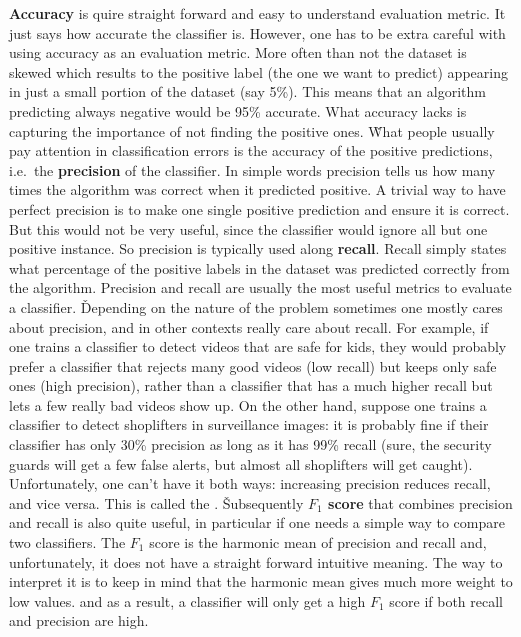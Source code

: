 \textbf{Accuracy} is quire straight forward and easy to understand evaluation metric. It just says how accurate the
classifier is. However, one has to be extra careful with using accuracy as an evaluation metric. More often than not
the dataset is skewed which results to the positive label (the one we want to predict) appearing in just a small
portion of the dataset (say 5\%). This means that an algorithm predicting always negative would be 95\% accurate.
What accuracy lacks is capturing the importance of not finding the positive ones. \v

What people usually pay attention in classification errors is the accuracy of the positive predictions, i.e.\ the
\textbf{precision} of the classifier. In simple words precision tells us how many times the algorithm was correct
when it predicted positive. A trivial way to have perfect precision is to make one single positive prediction and
ensure it is correct. But this would not be very useful, since the classifier would ignore all but one positive
instance. So precision is typically used along \textbf{recall}. Recall simply states what percentage of the positive
labels in the dataset was predicted correctly from the algorithm. Precision and recall are usually the most useful
metrics to evaluate a classifier. \v

Depending on the nature of the problem sometimes one mostly cares about precision, and in other contexts really care
about recall. For example, if one trains a classifier to detect videos that are safe for kids, they would probably
prefer a classifier that rejects many good videos (low recall) but keeps only safe ones (high precision), rather than
a classifier that has a much higher recall but lets a few really bad videos show up. On the other hand, suppose one
trains a classifier to detect shoplifters in surveillance images: it is probably fine if their classifier has only
30\% precision as long as it has 99\% recall (sure, the security guards will get a few false alerts, but almost all
shoplifters will get caught). Unfortunately, one can't have it both ways: increasing precision reduces recall, and
vice versa. This is called the . \v

Subsequently \textbf{$F_1$ score} that combines precision and recall is also quite useful, in particular if one needs
a simple way to compare two classifiers. The $F_1$ score is the harmonic mean of precision and recall and,
unfortunately, it does not have a straight forward intuitive meaning. The way to interpret it is to keep in mind that
the harmonic mean gives much more weight to low values. and as a result, a classifier will only get a high $F_1$
score if both recall and precision are high.


